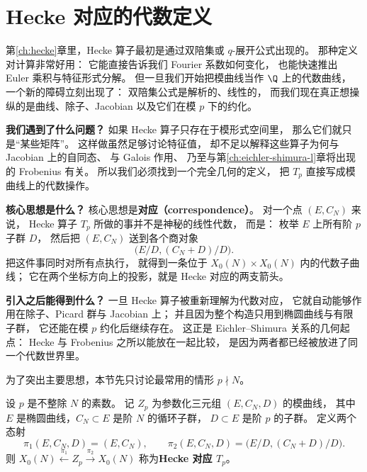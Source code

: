 \section{Hecke 对应的代数定义}
\label{sec:ch07-hecke-correspondences}

第\ref{ch:hecke}章里，Hecke 算子最初是通过双陪集或 $q$-展开公式出现的。
那种定义对计算非常好用：
它能直接告诉我们 Fourier 系数如何变化，
也能快速推出 Euler 乘积与特征形式分解。
但一旦我们开始把模曲线当作 $\Q$ 上的代数曲线，
一个新的障碍立刻出现了：
双陪集公式是解析的、线性的，
而我们现在真正想操纵的是曲线、除子、Jacobian 以及它们在模 $p$ 下的约化。

\textbf{我们遇到了什么问题？}
如果 Hecke 算子只存在于模形式空间里，
那么它们就只是“某些矩阵”。
这样做虽然足够讨论特征值，
却不足以解释这些算子为何与 Jacobian 上的自同态、
与 Galois 作用、
乃至与第\ref{ch:eichler-shimura-l}章将出现的 Frobenius 有关。
所以我们必须找到一个完全几何的定义，
把 $T_p$ 直接写成模曲线上的代数操作。

\textbf{核心思想是什么？}
核心思想是\textbf{对应（correspondence）}。
对一个点 $(E,C_N)$ 来说，
Hecke 算子 $T_p$ 所做的事并不是神秘的线性代数，
而是：
枚举 $E$ 上所有阶 $p$ 子群 $D$，
然后把 $(E,C_N)$ 送到各个商对象
\[
  \bigl(E/D,(C_N+D)/D\bigr).
\]
把这件事同时对所有点执行，
就得到一条位于 $X_0(N)\times X_0(N)$ 内的代数子曲线；
它在两个坐标方向上的投影，就是 Hecke 对应的两支箭头。

\textbf{引入之后能得到什么？}
一旦 Hecke 算子被重新理解为代数对应，
它就自动能够作用在除子、Picard 群与 Jacobian 上；
并且因为整个构造只用到椭圆曲线与有限子群，
它还能在模 $p$ 约化后继续存在。
这正是 Eichler--Shimura 关系的几何起点：
Hecke 与 Frobenius 之所以能放在一起比较，
是因为两者都已经被放进了同一个代数世界里。



为了突出主要思想，本节先只讨论最常用的情形 $p\nmid N$。

\begin{definition}[Hecke 对应 $T_p$]
\label{def:ch07-hecke-correspondence}
设 $p$ 是不整除 $N$ 的素数。
记 $Z_p$ 为参数化三元组 $(E,C_N,D)$ 的模曲线，
其中 $E$ 是椭圆曲线，$C_N\subset E$ 是阶 $N$ 的循环子群，
$D\subset E$ 是阶 $p$ 的子群。
定义两个态射
\[
  \pi_1(E,C_N,D)=(E,C_N),
  \qquad
  \pi_2(E,C_N,D)=\bigl(E/D,(C_N+D)/D\bigr).
\]
则 $X_0(N)\xleftarrow{\pi_1}Z_p\xrightarrow{\pi_2}X_0(N)$
称为\textbf{Hecke 对应 $T_p$}。
\end{definition}

